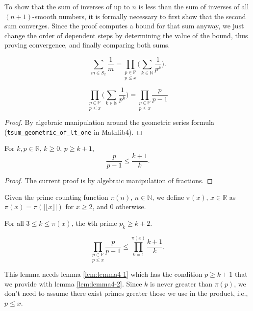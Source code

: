To show that the sum of inverses of up to $n$ is less than the sum of inverses of all $(n+1)$-smooth
numbers, it is formally necessary to first show that the second sum converges. Since the proof computes
a bound for that sum anyway, we just change the order of dependent steps by determining the value of
the bound, thus proving convergence, and finally comparing both sums.

\begin{lemma}
\label{lem:lemma2}
\leanok
    $$\sum_{m\in S_x}\frac{1}{m} = \underset{p\le x}{\prod_{p\in\mathbb{P}}}\Big(\sum_{k\in\mathbb{N}}\frac{1}{p^k}\Big).$$
\end{lemma}

\begin{lemma}
\label{lem:lemma3}
\leanok
    $$\underset{p\le x}{\prod_{p\in\mathbb{P}}}\Big(\sum_{k\in\mathbb{N}}\frac{1}{p^k}\Big) = \underset{p\le x}{\prod_{p\in\mathbb{P}}}\frac{p}{p-1}$$
\end{lemma}
\begin{proof}
\leanok
    By algebraic manipulation around the geometric series formula (\verb+tsum_geometric_of_lt_one+ in Mathlib4).
\end{proof}

\begin{lemma}
\label{lem:lemma4-1}
\leanok
For $k,p \in\mathbb{R}$, $k\ge0$, $p \ge k+1$,
$$\frac{p}{p-1} \le \frac{k+1}{k}.$$
\end{lemma}
\begin{proof}
\leanok
The current proof is by algebraic manipulation of fractions.
\end{proof}

\begin{definition-pre}
\label{def:piReal}
Given the prime counting function $\pi(n)$, $n\in\mathbb{N}$, we define $\pi(x)$, $x\in\mathbb{R}$ as $\pi(x) = \pi(|\lfloor x\rfloor|)$ for $x\ge2$, and $0$ otherwise.
\end{definition-pre}

\begin{lemma}
\label{lem:lemma4-2}
\leanok
    For all $3\le k\le \pi(x)$, the $k$th prime $p_k \ge k+2$.
\end{lemma}

\begin{lemma}
\label{lem:lemma4}
$$\underset{p\le x}{\prod_{p\in\mathbb{P}}}\frac{p}{p-1} \le \prod_{k=1}^{\pi(x)}\frac{k+1}{k}.$$
\end{lemma}
This lemma needs lemma \ref{lem:lemma4-1} which has the condition $p\ge k+1$ that we provide with
lemma \ref{lem:lemma4-2}. Since $k$ is never 
    greater than $\pi(p)$, we don't need to assume there exist primes greater those we use in the
    product, i.e., $p\le x$.

